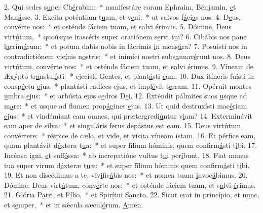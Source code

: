 2. Qui sedes s\uline{u}per Ch\uline{é}rubim:~* manifestáre coram Ephraim, Bénjamin, \uline{e}t Man\uline{á}sse.
3. Excita poténtiam t\uline{u}am, et v\uline{e}ni:~* ut salvos f\uline{á}ci\uline{a}s nos.
4. D\uline{e}us, conv\uline{é}rte nos:~* et osténde fáciem tuam, et s\uline{a}lvi \uline{é}rimus.
5. Dómine, D\uline{e}us virt\uline{ú}tum,~* quoúsque irascéris super oratiónem s\uline{e}rvi t\uline{u}i?
6. Cibábis nos pane l\uline{a}crim\uline{á}rum:~* et potum dabis nobis in lácrimis \uline{i}n mens\uline{ú}ra?
7. Posuísti nos in contradictiónem vic\uline{í}nis n\uline{o}stris:~* et inimíci nostri subs\uline{a}nnav\uline{é}runt nos.
8. Deus virt\uline{ú}tum, conv\uline{é}rte nos:~* et osténde fáciem tuam, et s\uline{a}lvi \uline{é}rimus.
9. Víneam de Ægýpto tr\uline{a}nstul\uline{í}sti:~* ejecísti Gentes, et plant\uline{á}sti \uline{e}am.
10. Dux itíneris fuísti in consp\uline{é}ctu \uline{e}jus:~* plantásti radíces ejus, et impl\uline{é}vit t\uline{e}rram.
11. Opéruit montes \uline{u}mbra \uline{e}jus:~* et arbústa ejus c\uline{e}dros D\uline{e}i.
12. Exténdit pálmites suos \uline{u}sque ad m\uline{a}re:~* et usque ad flumen prop\uline{á}gines \uline{e}jus.
13. Ut quid destruxísti mac\uline{é}riam \uline{e}jus:~* et vindémiant eam omnes, qui prætergredi\uline{ú}ntur v\uline{i}am?
14. Exterminávit eam \uline{a}per de s\uline{i}lva:~* et singuláris ferus dep\uline{á}stus est \uline{e}am.
15. Deus virt\uline{ú}tum, conv\uline{é}rtere:~* réspice de cælo, et vide, et vísita v\uline{í}neam \uline{i}stam.
16. Et pérfice eam, quam plantávit d\uline{é}xtera t\uline{u}a:~* et super fílium hóminis, quem confirm\uline{á}sti t\uline{i}bi.
17. Incénsa igni, \uline{e}t suff\uline{ó}ssa:~* ab increpatióne vultus t\uline{u}i per\uline{í}bunt.
18. Fiat manus tua super virum d\uline{é}xteræ t\uline{u}æ:~* et super fílium hóminis quem confirm\uline{á}sti t\uline{i}bi.
19. Et non discédimus a te, viv\uline{i}fic\uline{á}bis nos:~* et nomen tuum \uline{i}nvoc\uline{á}bimus.
20. Dómine, Deus virt\uline{ú}tum, conv\uline{é}rte nos:~* et osténde fáciem tuam, et s\uline{a}lvi \uline{é}rimus.
21. Glória P\uline{a}tri, et F\uline{í}lio,~* et Spir\uline{í}tui S\uline{a}ncto.
22. Sicut erat in princípio, et n\uline{u}nc, et s\uline{e}mper,~* et in sǽcula sæcul\uline{ó}rum. \uline{A}men.
